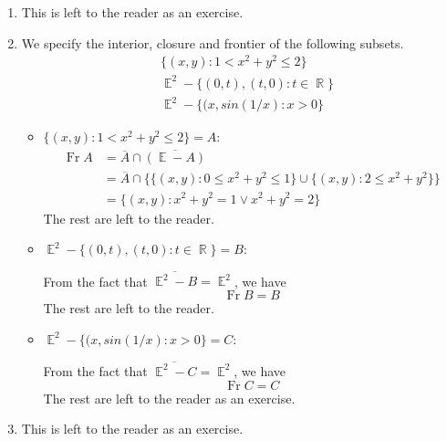 \documentclass{book}
\DeclareMathOperator*{\R}{\mathbb{R}}
\DeclareMathOperator*{\E}{\mathbb{E}}
\DeclareMathOperator*{\Ft}{\text{Fr}}
\begin{document}
\begin{enumerate}[(1)]
\begin{itemize}
        \end{itemize}

    \item This is left to the reader as an exercise.

    \item We specify the interior, closure and frontier of the following subsets. 
        \setcounter{equation}{0}
        \begin{align} \
            & \{(x,y): 1 < x^2+y^2 \leq 2\} \\
            & {\E}^2 - \{(0,t), (t,0): t\in \R \} \\
            & {\E}^2 - \{(x, sin(1/x): x>0\}
        \end{align} 

        \begin{itemize}
            \item $\{(x,y): 1 < x^2+y^2 \leq 2\} = A$: 
                \begin{align*}
                    \Ft A & = \overline{A} \cap  \overline{(\E - A)} \\
                    & = \overline{A} \cap  \big\{ \{(x,y): 0 \leq x^2+y^2 \leq 1\} \cup \{(x,y): 2 \leq x^2+y^2\} \big\}\\
                    & = \{(x,y): x^2+y^2 = 1 \lor x^2+y^2 = 2 \}
                \end{align*}
                The rest are left to the reader. 

            \item ${\E}^2 - \{(0,t), (t,0): t\in \R \} = B$: 
                \par From the fact that $\overline{{\E}^2 - B} = \E^2$, we have 
                \[\Ft B = B\]
                The rest are left to the reader. 

            \item ${\E}^2 - \{(x, sin(1/x): x>0\} = C$: 
                \par From the fact that $\overline{{\E}^2 - C} = \E^2$, we have 
                \[\Ft C = C\]
                The rest are left to the reader as an exercise. 
        \end{itemize}

    \item This is left to the reader as an exercise.


\end{enumerate}
\end{document}
